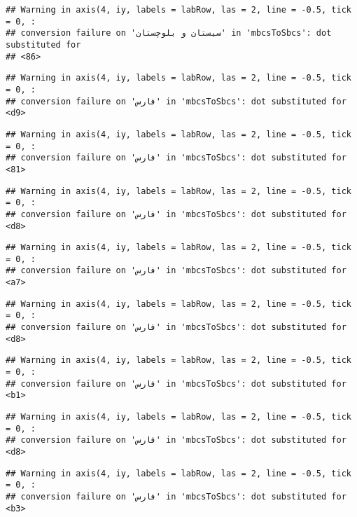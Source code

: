 \documentclass[
]{article}
\begin{document}
\begin{verbatim}
## Warning in axis(4, iy, labels = labRow, las = 2, line = -0.5, tick = 0, :
## conversion failure on 'سیستان و بلوچستان' in 'mbcsToSbcs': dot substituted for
## <86>
\end{verbatim}

\begin{verbatim}
## Warning in axis(4, iy, labels = labRow, las = 2, line = -0.5, tick = 0, :
## conversion failure on 'فارس' in 'mbcsToSbcs': dot substituted for <d9>
\end{verbatim}

\begin{verbatim}
## Warning in axis(4, iy, labels = labRow, las = 2, line = -0.5, tick = 0, :
## conversion failure on 'فارس' in 'mbcsToSbcs': dot substituted for <81>
\end{verbatim}

\begin{verbatim}
## Warning in axis(4, iy, labels = labRow, las = 2, line = -0.5, tick = 0, :
## conversion failure on 'فارس' in 'mbcsToSbcs': dot substituted for <d8>
\end{verbatim}

\begin{verbatim}
## Warning in axis(4, iy, labels = labRow, las = 2, line = -0.5, tick = 0, :
## conversion failure on 'فارس' in 'mbcsToSbcs': dot substituted for <a7>
\end{verbatim}

\begin{verbatim}
## Warning in axis(4, iy, labels = labRow, las = 2, line = -0.5, tick = 0, :
## conversion failure on 'فارس' in 'mbcsToSbcs': dot substituted for <d8>
\end{verbatim}

\begin{verbatim}
## Warning in axis(4, iy, labels = labRow, las = 2, line = -0.5, tick = 0, :
## conversion failure on 'فارس' in 'mbcsToSbcs': dot substituted for <b1>
\end{verbatim}

\begin{verbatim}
## Warning in axis(4, iy, labels = labRow, las = 2, line = -0.5, tick = 0, :
## conversion failure on 'فارس' in 'mbcsToSbcs': dot substituted for <d8>
\end{verbatim}

\begin{verbatim}
## Warning in axis(4, iy, labels = labRow, las = 2, line = -0.5, tick = 0, :
## conversion failure on 'فارس' in 'mbcsToSbcs': dot substituted for <b3>
\end{verbatim}
\end{document}
